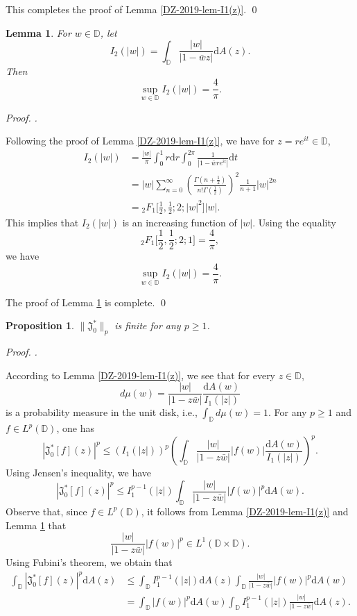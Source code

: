 \documentclass[a4paper,12pt]{amsart}
\newtheorem{lem}{Lemma}[section]
\newtheorem{prop}[thm]{Proposition}
\theoremstyle{definition}
\numberwithin{equation}{section}
\newenvironment{pf}[1][]{%
 \vskip 3mm
 \noindent
 \ifthenelse{\equal{#1}{}}%
  {{\slshape Proof. }}%
  {{\slshape #1.} }%
 }%
{\qed\bigskip}
\newcommand{\ID}{{\mathbb D}}
\def\be{\begin{equation}}
\def\ee{\end{equation}}
\newcommand{\bpf}{\begin{pf}}
\newcommand{\epf}{\end{pf}}
\begin{document}
This completes the proof of Lemma \ref{DZ-2019-lem-I1(z)}.
\epf

\begin{lem}\label{DZ-2019-lem-I1(w)}
For $w\in\ID$, let $$I_2(|w|)=\int_{\ID}\frac{|w|}{|1-\bar{w}z|}\mathrm{d}A(z) .$$
Then
$$\sup\limits_{w\in\ID}I_2(|w|)= \frac{4}{\pi}.$$
\end{lem}
\bpf
Following the proof of Lemma \ref{DZ-2019-lem-I1(z)}, we have for $z=re^{it}\in\ID$,
\begin{align*}
I_2(|w|)&=\frac{|w|}{\pi}\int_0^1r\mathrm{d} r\int_0^{2\pi}\frac{1}{|1-\bar{w}re^{it}|}\mathrm{d} t\\ \nonumber
&=|w|\sum\limits_{n=0}^{\infty}\left(\frac{\Gamma(n+\frac{1}{2})}{n!\Gamma(\frac{1}{2})}\right)^2\frac{1}{n+1}|w|^{2n}\\ \nonumber
&={}_2F_1\bigg[\frac{1}{2}, \frac{1}{2}; 2; |w|^2\bigg]|w|.
\end{align*}
This implies that $I_2(|w|)$ is an increasing function of $|w|$. Using the equality
\be\label{2dpi}{}_2F_1\bigg[\frac{1}{2}, \frac{1}{2}; 2; 1\bigg]=\frac{4}{\pi},\ee
we have
$$\sup\limits_{w\in\ID}I_2(|w|)= \frac{4}{\pi}.$$

The proof of Lemma \ref{DZ-2019-lem-I1(w)} is complete.
\epf

\begin{prop}\label{thm-Lp-BC}
$\|\mathfrak{J}_0^*\|_p$ is finite for any $p\geq1$.
\end{prop}
\bpf
According to Lemma \ref{DZ-2019-lem-I1(z)}, we see that for every $z\in\ID$,
$$d\mu(w)=\frac{|w|}{|1-z\bar{w}|}\frac{\mathrm{d}A(w) }{I_1(|z|)}$$
is a probability measure in the unit disk, i.e., $\int_{\ID}d\mu(w)=1$.
For any $p\geq1$ and $f\in L^p(\ID)$, one has
$$|\mathfrak{J}_0^*[f](z)|^p\leq\left(I_1(|z|)\right)^p\left(\int_{\ID}\frac{|w|}{|1-z\bar{w}|}|f(w)|\frac{\mathrm{d}A(w) }{I_1(|z|)}\right)^p.$$
Using Jensen's inequality, we have
$$|\mathfrak{J}_0^*[f](z)|^p\leq I_1^{p-1}(|z|)\int_{\ID}\frac{|w|}{|1-z\bar{w}|}|f(w)|^p\mathrm{d}A(w) .$$
Observe that, since $f\in L^p(\ID)$, it follows from Lemma \ref{DZ-2019-lem-I1(z)} and Lemma \ref{DZ-2019-lem-I1(w)} that
$$\frac{|w|}{|1-z\bar{w}|}|f(w)|^p\in L^1(\ID\times \ID).$$
Using Fubini's theorem, we obtain that
\begin{align*}
\int_{\ID}|\mathfrak{J}_0^*[f](z)|^p\mathrm{d}A(z) &\leq\int_{\ID}I_1^{p-1}(|z|)\mathrm{d}A(z) \int_{\ID}\frac{|w|}{|1-z\bar{w}|}|f(w)|^p\mathrm{d}A(w) \\ \nonumber
&=\int_{\ID}|f(w)|^p\mathrm{d}A(w) \int_{\ID}I_1^{p-1}(|z|)\frac{|w|}{|1-z\bar{w}|}\mathrm{d}A(z) .
\end{align*}
\end{document}
